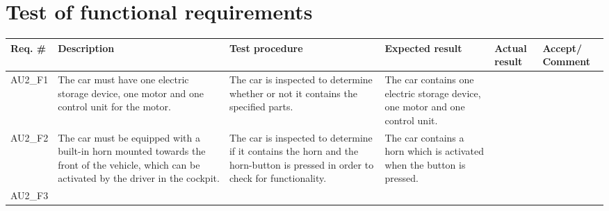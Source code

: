 \section{Test of functional requirements}

\begin{longtable}{|p{1.6 cm}|p{2.9 cm}|p{2.9 cm}|p{1.9 cm}|p{1.8 cm}|p{1.8 cm}|}
	\hline
	\textbf{Req. \#} & \textbf{Description} & \textbf{Test procedure} & 
	\textbf{Expected result} & \textbf{Actual result} & \textbf{Accept/ Comment} \\ \hline
	\endhead
	AU2\_F1 
	& The car must have one electric storage device, one motor and one control unit for the motor.
	& The car is inspected to determine whether or not it contains the specified parts.
	& The car contains one electric storage device, one motor and one control unit.
	& 
	& \\ \hline
	AU2\_F2 
	& The car must be equipped with a built-in horn mounted towards the front of the vehicle, which can be activated by the driver in the cockpit.
	& The car is inspected to determine if it contains the horn and the horn-button is pressed in order to check for functionality.
	& The car contains a horn which is activated when the button is pressed.
	& 
	& \\ \hline
	AU2\_F3 
	

\end{longtable}

